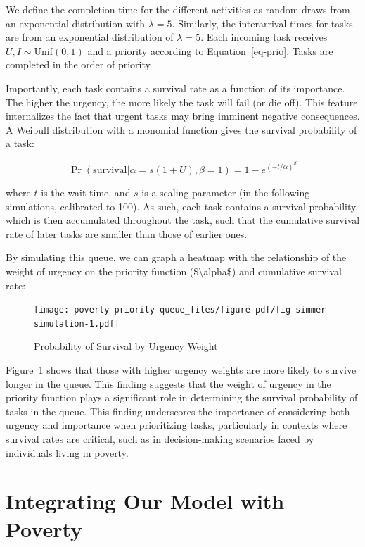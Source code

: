 \documentclass[
]{report}
\begin{document}
We define the completion time for the different activities as random
draws from an exponential distribution with \(\lambda = 5\). Similarly,
the interarrival times for tasks are from an exponential distribution of
\(\lambda = 5\). Each incoming task receives
\(U, I \sim \text{Unif}(0,1)\) and a priority according to
Equation~\ref{eq-prio}. Tasks are completed in the order of priority.

Importantly, each task contains a survival rate as a function of its
importance. The higher the urgency, the more likely the task will fail
(or die off). This feature internalizes the fact that urgent tasks may
bring imminent negative consequences. A Weibull distribution with a
monomial function gives the survival probability of a task:

\[
\Pr (\text{survival}|\alpha = s(1+U),\beta=1) = 1 - e^{(-t/\alpha)^\beta}
\]

where \(t\) is the wait time, and \(s\) is a scaling parameter (in the
following simulations, calibrated to 100). As such, each task contains a
survival probability, which is then accumulated throughout the task,
such that the cumulative survival rate of later tasks are smaller than
those of earlier ones.

By simulating this queue, we can graph a heatmap with the relationship
of the weight of urgency on the priority function
(\$\textbackslash alpha\$) and cumulative survival rate:

\begin{figure}

{\centering \texttt{[image: poverty-priority-queue\_files/figure-pdf/fig-simmer-simulation-1.pdf]}

}

\caption{\label{fig-simmer-simulation}Probability of Survival by Urgency
Weight}

\end{figure}

Figure~\ref{fig-simmer-simulation} shows that those with higher urgency
weights are more likely to survive longer in the queue. This finding
suggests that the weight of urgency in the priority function plays a
significant role in determining the survival probability of tasks in the
queue. This finding underscores the importance of considering both
urgency and importance when prioritizing tasks, particularly in contexts
where survival rates are critical, such as in decision-making scenarios
faced by individuals living in poverty.

\hypertarget{sec-poverty}{%
\section{Integrating Our Model with Poverty}\label{sec-poverty}}
\end{document}
